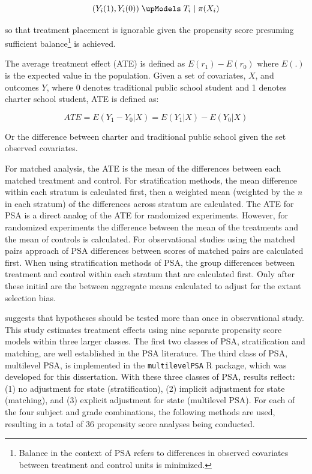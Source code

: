 \documentclass[letterpaper,12p,twoside]{article} %
\begin{document}
\begin{equation}
({ Y }_{ i }(1),{ Y }_{ i }(0)) \; \upModels \; { T }_{ i } \; | \; \pi({ X }_{ i })
\end{equation}

\noindent so that treatment placement is ignorable given the propensity score presuming sufficient balance\footnote{Balance in the context of PSA refers to differences in observed covariates between treatment and control units is minimized.} is achieved.

The average treatment effect (ATE) is defined as $E(r_1) - E(r_0)$ where $E(.)$ is the expected value in the population. Given a set of covariates, $X$, and outcomes $Y$, where 0 denotes traditional public school student and 1 denotes charter school student, ATE is defined as:

\begin{equation}
ATE=E(Y_{1}-Y_{0}|X)=E(Y_{1}|X)-E(Y_{0}|X)
\end{equation}
 
\noindent Or the difference between charter and traditional public school given the set observed covariates.

For matched analysis, the ATE is the mean of the differences between each matched treatment and control. For stratification methods, the mean difference within each stratum is calculated first, then a weighted mean (weighted by the \textit{n} in each stratum) of the differences across stratum are calculated. The ATE for PSA is a direct analog of the ATE for randomized experiments. However, for randomized experiments the difference between the mean of the treatments and the mean of controls is calculated. For observational studies using the matched pairs approach of PSA differences between scores of matched pairs are calculated first. When using stratification methods of PSA, the group differences between treatment and control within each stratum that are calculated first. Only after these initial are the between aggregate means calculated to adjust for the extant selection bias.

 suggests that hypotheses should be tested more than once in observational study. This study estimates treatment effects using nine separate propensity score models within three larger classes. The first two classes of PSA, stratification and matching, are well established in the PSA literature. The third class of PSA, multilevel PSA, is implemented in the \texttt{multilevelPSA} R package, which was developed for this dissertation. With these three classes of PSA, results reflect: (1) no adjustment for state (stratification), (2) implicit adjustment for state (matching), and (3) explicit adjustment for state (multilevel PSA). For each of the four subject and grade combinations, the following methods are used, resulting in a total of 36 propensity score analyses being conducted.
\end{document}
